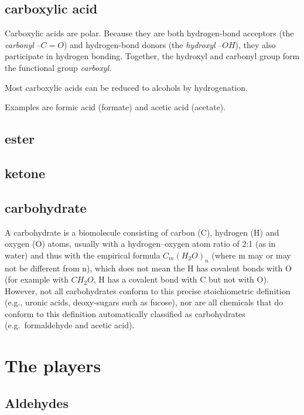 \documentclass{article}
\begin{document}
\subsection{carboxylic acid}

Carboxylic acids are polar. Because they are both hydrogen-bond acceptors (the {\em
carbonyl\/} $–C=O$) and hydrogen-bond donors (the {\em hydroxyl\/} $–OH$), they also
participate in hydrogen bonding. Together, the hydroxyl and carbonyl group form the
functional group {\em carboxyl}.

Most carboxylic acids can be reduced to alcohols by hydrogenation.

Examples are formic acid (formate) and acetic acid (acetate).

\subsection{ester}

\subsection{ketone}

\subsection{carbohydrate}
A carbohydrate is a biomolecule consisting of carbon (C), hydrogen (H) and oxygen (O)
atoms, usually with a hydrogen–oxygen atom ratio of 2:1 (as in water) and thus with the
empirical formula $C_m{(H_2O)}_n$ (where m may or may not be different from n), which does
not mean the H has covalent bonds with O (for example with $CH_2O$, H has a covalent bond
with C but not with O). However, not all carbohydrates conform to this precise
stoichiometric definition (e.g., uronic acids, deoxy-sugars such as fucose), nor are all
chemicals that do conform to this definition automatically classified as carbohydrates
(e.g.\ formaldehyde and acetic acid).


\pagebreak
\section{The players}\label{sec_players}

\subsection{Aldehydes}
\end{document}
